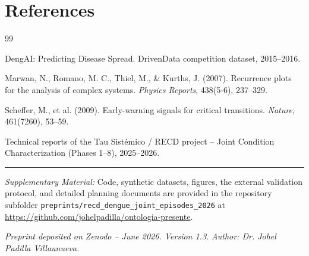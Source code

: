 \documentclass[11pt,a4paper]{article}
\begin{document}
\section*{References}
\begin{thebibliography}{99}

DengAI: Predicting Disease Spread. DrivenData competition dataset, 2015--2016.

Marwan, N., Romano, M. C., Thiel, M., \& Kurths, J. (2007). Recurrence plots for the analysis of complex systems. \textit{Physics Reports}, 438(5-6), 237--329.

Scheffer, M., et al. (2009). Early-warning signals for critical transitions. \textit{Nature}, 461(7260), 53--59.

Technical reports of the Tau Sistémico / RECD project – Joint Condition Characterization (Phases 1--8), 2025--2026.

\end{thebibliography}

\vspace{0.8em}
\hrule
\vspace{0.5em}
\begin{sloppypar}
\noindent\textit{Supplementary Material:} Code, synthetic datasets, figures, the external validation protocol, and detailed planning documents are provided in the repository subfolder \texttt{preprints/recd\_dengue\_joint\_episodes\_2026} at \url{https://github.com/johelpadilla/ontologia-presente}.
\end{sloppypar}

\vspace{0.6em}
\noindent\textit{Preprint deposited on Zenodo – June 2026. Version 1.3.}  
\noindent\textit{Author: Dr. Johel Padilla Villaunueva.}
\end{document}
